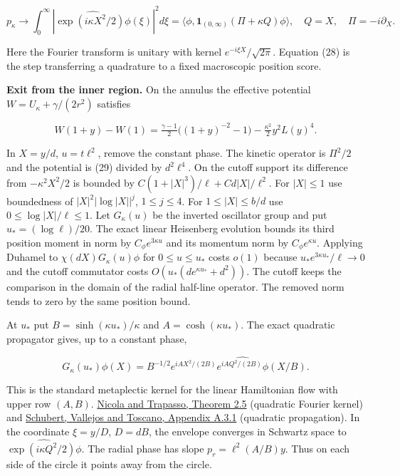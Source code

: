 \documentclass[11pt,a4paper]{article}
\begin{document}
\[
  p_\kappa\longrightarrow
  \int_0^\infty\left|\widehat{\exp(i\kappa X^2/2)\phi}(\xi)\right|^2d\xi
  =\langle\phi,\mathbf1_{(0,\infty)}(\Pi+\kappa Q)\phi\rangle ,
  \quad Q=X,\quad\Pi=-i\partial_X .                              \tag{28}
\]

Here the Fourier transform is unitary with kernel
\(e^{-i\xi X}/\sqrt{2\pi}\). Equation (28) is the step transferring a
quadrature to a fixed macroscopic position score.

\textbf{Exit from the inner region.} On the annulus the effective
potential \(W=U_\kappa+\gamma/(2r^2)\) satisfies

\[
 W(1+y)-W(1)=\tfrac{\gamma-1}{2}\big((1+y)^{-2}-1\big)
              -\tfrac{\kappa^2}{2}y^2L(y)^4 .                    \tag{29}
\]

In \(X=y/d\), \(u=t\ell^2\), remove the constant phase. The kinetic
operator is \(\Pi^2/2\) and the potential is (29) divided by
\(d^2\ell^4\). On the cutoff support its difference from
\(-\kappa^2X^2/2\) is bounded by \(C(1+|X|^3)/\ell+Cd|X|/\ell^2\). For
\(|X|\le1\) use boundedness of \(|X|^2|\log |X||^j\), \(1\le j\le4\).
For \(1\le|X|\le b/d\) use \(0\le\log|X|/\ell\le1\). Let \(G_\kappa(u)\)
be the inverted oscillator group and put \(u_*=(\log\ell)/20\). The
exact linear Heisenberg evolution bounds its third position moment in
norm by \(C_\phi e^{3\kappa u}\) and its momentum norm by
\(C_\phi e^{\kappa u}\). Applying Duhamel to \(\chi(dX)G_\kappa(u)\phi\)
for \(0\le u\le u_*\) costs \(o(1)\) because
\(u_* e^{3\kappa u_*}/\ell\to0\) and the cutoff commutator costs
\(O(u_*(d e^{\kappa u_*}+d^2))\). The cutoff keeps the comparison in the
domain of the radial half-line operator. The removed norm tends to zero
by the same position bound.

At \(u_*\) put \(B=\sinh(\kappa u_*)/\kappa\) and
\(A=\cosh(\kappa u_*)\). The exact quadratic propagator gives, up to a
constant phase,

\[
 G_\kappa(u_*)\phi(X)= B^{-1/2} e^{i A X^2/(2B)}
       \widehat{e^{i A Q^2/(2B)}\phi}(X/B).
\]

This is the standard metaplectic kernel for the linear Hamiltonian flow
with upper row \((A,B)\).
\href{https://iris.polito.it/retrieve/72e5ea46-6226-42f1-b494-80940b4b02b8/NT_CMP20_rev.pdf}{Nicola
and Trapasso, Theorem 2.5} (quadratic Fourier kernel) and
\href{https://arxiv.org/pdf/1112.4056}{Schubert, Vallejos and Toscano,
Appendix A.3.1} (quadratic propagation). In the coordinate \(\xi=y/D\),
\(D=dB\), the envelope converges in Schwartz space to
\(\widehat{\exp(i\kappa Q^2/2)\phi}\). The radial phase has slope
\(p_r=\ell^2(A/B)y\). Thus on each side of the circle it points away
from the circle.
\end{document}
